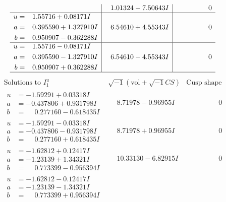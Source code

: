 \documentclass[1p]{elsarticle_modified}
\theoremstyle{definition}
\newcommand{\I}{\sqrt{-1}}
\begin{document}
$$\begin{array}{c|c|c}
 & \phantom{-}1.01324 - 7.50643 I & \phantom{-0.000000 } 0 \\ \hline\begin{aligned}
u &= \phantom{-}1.55716 + 0.08171 I \\
a &= \phantom{-}0.395590 + 1.327910 I \\
b &= \phantom{-}0.950907 - 0.362288 I\end{aligned}
 & \phantom{-}6.54610 + 4.55343 I & \phantom{-0.000000 } 0 \\ \hline\begin{aligned}
u &= \phantom{-}1.55716 - 0.08171 I \\
a &= \phantom{-}0.395590 - 1.327910 I \\
b &= \phantom{-}0.950907 + 0.362288 I\end{aligned}
 & \phantom{-}6.54610 - 4.55343 I & \phantom{-0.000000 } 0\\
 \hline 
 \end{array}$$\newpage$$\begin{array}{c|c|c}  
\text{Solutions to }I^u_{1}& \I (\text{vol} + \sqrt{-1}CS) & \text{Cusp shape}\\
 \hline 
\begin{aligned}
u &= -1.59291 + 0.03318 I \\
a &= -0.437806 + 0.931798 I \\
b &= \phantom{-}0.277160 - 0.618435 I\end{aligned}
 & \phantom{-}8.71978 - 0.96955 I & \phantom{-0.000000 } 0 \\ \hline\begin{aligned}
u &= -1.59291 - 0.03318 I \\
a &= -0.437806 - 0.931798 I \\
b &= \phantom{-}0.277160 + 0.618435 I\end{aligned}
 & \phantom{-}8.71978 + 0.96955 I & \phantom{-0.000000 } 0 \\ \hline\begin{aligned}
u &= -1.62812 + 0.12417 I \\
a &= -1.23139 + 1.34321 I \\
b &= \phantom{-}0.773399 - 0.956394 I\end{aligned}
 & \phantom{-}10.33130 - 6.82915 I & \phantom{-0.000000 } 0 \\ \hline\begin{aligned}
u &= -1.62812 - 0.12417 I \\
a &= -1.23139 - 1.34321 I \\
b &= \phantom{-}0.773399 + 0.956394 I\end{aligned}

\end{array}$$
\end{document}
